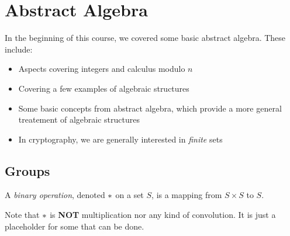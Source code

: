 \section{Abstract Algebra}\label{sec:Abstract_Algebra}
In the beginning of this course, we covered some basic abstract algebra.
These include:
\begin{itemize}[noitemsep]
\item Aspects covering integers and calculus modulo $n$
\item Covering a few examples of algebraic structures
\item Some basic concepts from abstract algebra, which provide a more general treatement of algebraic structures
\item In cryptography, we are generally interested in \emph{finite} sets
\end{itemize}

\subsection{Groups}\label{subsec:Groups}
\begin{definition}\label{def:Binary_Operation}
  A \emph{binary operation}, denoted $*$ on a set $S$, is a mapping from $S \times S$ to $S$.
  \begin{remark}
    Note that $*$ is \textbf{NOT} multiplication nor any kind of convolution.
    It is just a placeholder for some  that can be done.
  \end{remark}
\end{definition}

